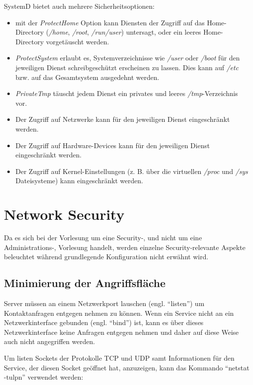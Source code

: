 SystemD bietet auch mehrere Sicherheitsoptionen:

\begin{itemize}
	\item mit der \textit{ProtectHome} Option kann Diensten der Zugriff auf das Home-Directory (\textit{/home}, \textit{/root}, \textit{/run/user}) untersagt, oder ein leeres Home-Directory vorgetäuscht werden.
	\item \textit{ProtectSystem} erlaubt es, Systemverzeichnisse wie \textit{/user} oder \textit{/boot} für den jeweiligen Dienst schreibgeschützt erscheinen zu lassen. Dies kann auf \textit{/etc} bzw. auf das Gesamtsystem ausgedehnt werden.
	\item \textit{PrivateTmp} täuscht jedem Dienst ein privates und leeres \textit{/tmp}-Verzeichnis vor.
	\item Der Zugriff auf Netzwerke kann für den jeweiligen Dienst eingeschränkt werden.
	\item Der Zugriff auf Hardware-Devices kann für den jeweiligen Dienst eingeschränkt werden.
	\item Der Zugriff auf Kernel-Einstellungen (z. B. über die virtuellen \textit{/proc} und \textit{/sys} Dateisysteme) kann eingeschränkt werden.
\end{itemize}

\chapter{Network Security}

Da es sich bei der Vorlesung um eine Security-, und nicht um eine Administrations-, Vorlesung handelt, werden einzelne Security-relevante Aspekte beleuchtet während grundlegende Konfiguration nicht erwähnt wird.

\section{Minimierung der Angriffsfläche}

Server müssen an einem Netzwerkport lauschen (engl. ``listen'') um Kontaktanfragen entgegen nehmen zu können. Wenn ein Service nicht an ein Netzwerkinterface gebunden (engl. ``bind'') ist, kann es über dieses Netzwerkinterface keine Anfragen entgegen nehmen und daher auf diese Weise auch nicht angegriffen werden.

Um listen Sockets der Protokolle TCP und UDP samt Informationen für den Service, der diesen Socket geöffnet hat, anzuzeigen, kann das Kommando ``netstat -tulpn'' verwendet werden:

